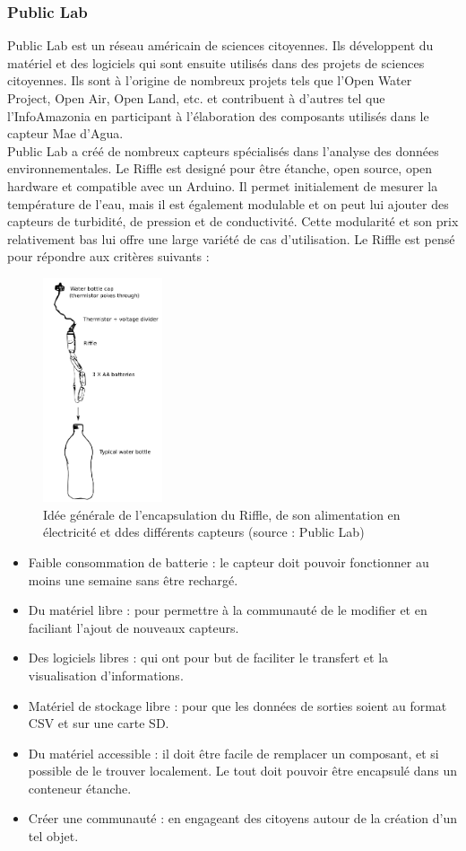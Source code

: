 \documentclass[10pt, conference, compsocconf]{llncs}
\begin{document}
		\subsubsection{Public Lab}
		Public Lab est un réseau américain de sciences citoyennes. Ils développent du matériel et des logiciels qui sont ensuite utilisés dans des projets de sciences citoyennes. Ils sont à l'origine de nombreux projets tels que l'Open Water Project, Open Air, Open Land, etc. et contribuent à d'autres tel que l'InfoAmazonia en participant à l'élaboration des composants utilisés dans le capteur Mae d'Agua.\\
			Public Lab a créé de nombreux capteurs spécialisés dans l'analyse des données environnementales. Le Riffle est designé pour être étanche, open source, open hardware et compatible avec un Arduino. Il permet initialement de mesurer la température de l'eau, mais il est également modulable et on peut lui ajouter des capteurs de turbidité, de pression et de conductivité. Cette modularité et son prix relativement bas lui offre une large variété de cas d'utilisation. Le Riffle est pensé pour répondre aux critères suivants :
			\begin{figure}
				\begin{center}
					\includegraphics[width=100pt]{bottle_enclosure.png}
				\end{center}
				\caption{Idée générale de l'encapsulation du Riffle, de son alimentation en électricité et ddes différents capteurs (source : Public Lab)}
			\end{figure}
			\begin{itemize}
				\item Faible consommation de batterie : le capteur doit pouvoir fonctionner au moins une semaine sans être rechargé.
				\item Du matériel libre : pour permettre à la communauté de le modifier et en faciliant l'ajout de nouveaux capteurs.
				\item Des logiciels libres : qui ont pour but de faciliter le transfert et la visualisation d'informations.
				\item Matériel de stockage libre : pour que les données de sorties soient au format CSV et sur une carte SD.
				\item Du matériel accessible : il doit être facile de remplacer un composant, et si possible de le trouver localement. Le tout doit pouvoir être encapsulé dans un conteneur étanche.
				\item Créer une communauté : en engageant des citoyens autour de la création d'un tel objet.
			\end{itemize}
\end{document}
